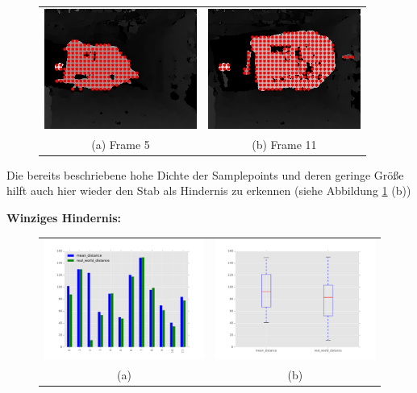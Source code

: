	\begin{figure}[h]
		\centering
		\begin{tabular}{cc}
		\includegraphics[width=5cm]{img/evaluation/sample_tiny_test_5_disparity}&
		\includegraphics[width=5cm]{img/evaluation/sample_tiny_test_11_disparity}\\
		(a) Frame 5 &  (b) Frame 11
		\end{tabular}
		\caption{}
		\label{fig:sample_eval_medium_fails}
	\end{figure}
	
	\noindent
	Die bereits beschriebene hohe Dichte der Samplepoints und deren geringe Größe hilft auch hier wieder den Stab als Hindernis zu erkennen (siehe Abbildung \ref{fig:sample_eval_medium_fails} (b))


	\noindent
	\textbf{Winziges Hindernis:}\\


	\begin{figure}[h]
		\centering
		\begin{tabular}{cc}
		\includegraphics[width=7cm]{img/evaluation/sample_tiny_bar}&
		\includegraphics[width=7cm]{img/evaluation/sample_tiny_box}\\
		 (a) & (b)
		\end{tabular}
		\caption{}
	    \label{fig:sample_eval_tiny}
	\end{figure}

